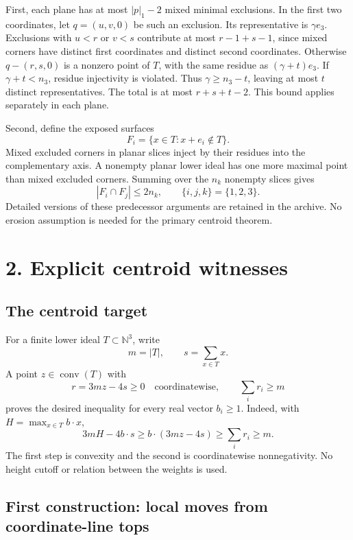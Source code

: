 \documentclass[
  11pt,
  a4paper,
]{article}
\let\oldsection\section
\renewcommand{\section}{\Needspace{7\baselineskip}\oldsection}
\begin{document}
First, each plane has at most \(|p|_1-2\) mixed minimal exclusions. In
the first two coordinates, let \(q=(u,v,0)\) be such an exclusion. Its
representative is \(\gamma e_3\). Exclusions with \(u<r\) or \(v<s\)
contribute at most \(r-1+s-1\), since mixed corners have distinct first
coordinates and distinct second coordinates. Otherwise \(q-(r,s,0)\) is
a nonzero point of \(T\), with the same residue as \((\gamma+t)e_3\). If
\(\gamma+t<n_3\), residue injectivity is violated. Thus
\(\gamma\ge n_3-t\), leaving at most \(t\) distinct representatives. The
total is at most \(r+s+t-2\). This bound applies separately in each
plane.

Second, define the exposed surfaces \[
F_i=\{x\in T:x+e_i\notin T\}.
\] Mixed excluded corners in planar slices inject by their residues into
the complementary axis. A nonempty planar lower ideal has one more
maximal point than mixed excluded corners. Summing over the \(n_k\)
nonempty slices gives \[
|F_i\cap F_j|\le2n_k,\qquad\{i,j,k\}=\{1,2,3\}. \tag{G2}
\] Detailed versions of these predecessor arguments are retained in the
archive. No erosion assumption is needed for the primary centroid
theorem.

\hypertarget{explicit-centroid-witnesses}{%
\section{2. Explicit centroid
witnesses}\label{explicit-centroid-witnesses}}

\hypertarget{the-centroid-target}{%
\subsection{The centroid target}\label{the-centroid-target}}

For a finite lower ideal \(T\subset\mathbb N^3\), write \[
m=|T|,\qquad s=\sum_{x\in T}x.
\] A point \(z\in\operatorname{conv}(T)\) with \[
r=3mz-4s\ge0\quad\text{coordinatewise},\qquad
\sum_i r_i\ge m
\tag{C1}
\] proves the desired inequality for every real vector \(b_i\ge1\).
Indeed, with \(H=\max_{x\in T}b\cdot x\), \[
3mH-4b\cdot s
\ge b\cdot(3mz-4s)
\ge\sum_i r_i
\ge m.
\tag{C2}
\] The first step is convexity and the second is coordinatewise
nonnegativity. No height cutoff or relation between the weights is used.

\hypertarget{first-construction-local-moves-from-coordinate-line-tops}{%
\subsection{First construction: local moves from coordinate-line
tops}\label{first-construction-local-moves-from-coordinate-line-tops}}
\end{document}
